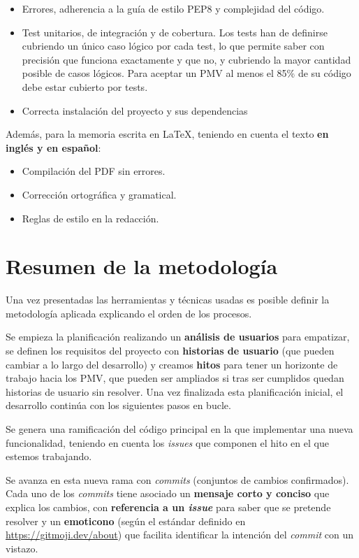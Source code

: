 \begin{itemize}
	\item{Errores, adherencia a la guía de estilo PEP8 \cite{pep8} y complejidad del código.}
	\item{Test unitarios, de integración y de cobertura. Los tests han de definirse cubriendo un único caso lógico por cada test, lo que permite saber con precisión que funciona exactamente y que no, y cubriendo la mayor cantidad posible de casos lógicos. Para aceptar un PMV al menos el 85\% de su código debe estar cubierto por tests.}
	\item{Correcta instalación del proyecto y sus dependencias}
\end{itemize}

Además, para la memoria escrita en LaTeX, teniendo en cuenta el texto \textbf{en inglés y en español}:
\begin{itemize}
	\item{Compilación del PDF sin errores.}
	\item{Corrección ortográfica y gramatical.}
	\item{Reglas de estilo en la redacción.}
\end{itemize}


\section{Resumen de la metodología}

Una vez presentadas las herramientas y técnicas usadas es posible definir la metodología aplicada explicando el orden de los procesos.

Se empieza la planificación realizando un \textbf{análisis de usuarios} para empatizar, se definen los requisitos del proyecto con \textbf{historias de usuario} (que pueden cambiar a lo largo del desarrollo) y creamos \textbf{hitos} para tener un horizonte de trabajo hacia los PMV, que pueden ser ampliados si tras ser cumplidos quedan historias de usuario sin resolver. Una vez finalizada esta planificación inicial, el desarrollo continúa con los siguientes pasos en bucle. 

Se genera una ramificación del código principal en la que implementar una nueva funcionalidad, teniendo en cuenta los \textit{issues} que componen el hito en el que estemos trabajando.

Se avanza en esta nueva rama con \textit{commits} (conjuntos de cambios confirmados). Cada uno de los \textit{commits} tiene asociado un \textbf{mensaje corto y conciso} que explica los cambios, con \textbf{referencia a un \textit{issue}} para saber que se pretende resolver y un \textbf{emoticono} (según el estándar definido en \url{https://gitmoji.dev/about}) que facilita identificar la intención del \textit{commit} con un vistazo.

